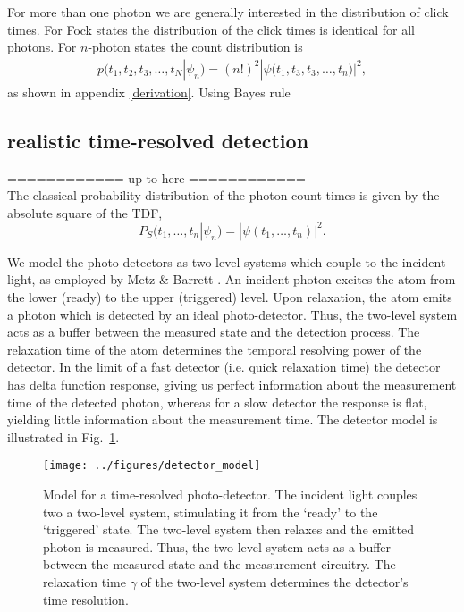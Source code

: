 \documentclass[aps,pra,twocolumn,amsmath,amssymb,color,superscriptaddress]{revtex4}
\newcommand{\blue}{\color{blue}}
\begin{document}
For more than one photon we are generally interested in the distribution of click times. For Fock states the distribution of the click times is identical for all photons. For $n$-photon states the count distribution is    
\begin{align}
p(t_1,t_2,t_3, \ldots, t_N|\psi_n) = (n!)^2   |\psi\big(t_1,t_3,t_3,\ldots, t_n \big)|^2,
\end{align}
as shown in appendix \ref{derivation}. Using Bayes rule


 \subsection{realistic time-resolved detection}

{\blue ============ up to here ============}\\
The classical probability distribution {\blue of the photon count times} is given by the absolute square of the TDF,
\begin{equation}
P_S(t_1,\dots,t_n|\psi_n)=|\psi(t_1,\dots,t_n)|^2.
\end{equation}

We model the photo-detectors as two-level systems which couple to the incident light, as employed by Metz \& Barrett \cite{bib:metz2008effect}. An incident photon excites the atom from the lower (ready) to the upper (triggered) level. Upon relaxation, the atom emits a photon which is detected by an ideal photo-detector. Thus, the two-level system acts as a buffer between the measured state and the detection process. The relaxation time of the atom determines the temporal resolving power of the detector. In the limit of a fast detector (i.e. quick relaxation time) the detector has delta function response, giving us perfect information about the measurement time of the detected photon, whereas for a slow detector the response is flat, yielding little information about the measurement time. The detector model is illustrated in Fig.~\ref{fig:det_model}.

\begin{figure}[!htb]
\texttt{[image: ../figures/detector\_model]}
\caption{Model for a time-resolved photo-detector. The incident light couples two a two-level system, stimulating it from the `ready' to the `triggered' state. The two-level system then relaxes and the emitted photon is measured. Thus, the two-level system acts as a buffer between the measured state and the measurement circuitry. The relaxation time $\gamma$ of the two-level system determines the detector's time resolution.} \label{fig:det_model}
\end{figure}
\end{document}
